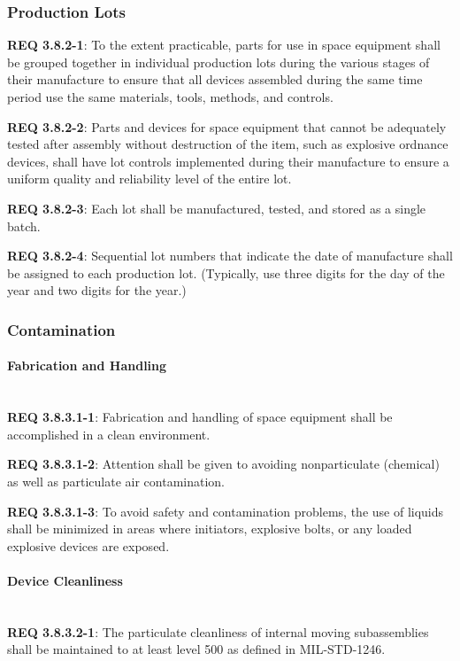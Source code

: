 \documentclass[12pt]{article}
\begin{document}
\subsubsection{Production Lots} %
\noindent \textbf{REQ 3.8.2-1}: To the extent practicable, parts for use in space equipment shall be grouped together in individual production lots during the various stages of their manufacture to ensure that all devices assembled during the same time period use the same materials, tools, methods, and controls. 

\noindent \textbf{REQ 3.8.2-2}: Parts and devices for space equipment that cannot be adequately tested after assembly without destruction of the item, such as explosive ordnance devices, shall have lot controls implemented during their manufacture to ensure a uniform quality and reliability level of the entire lot. 

\noindent \textbf{REQ 3.8.2-3}: Each lot shall be manufactured, tested, and stored as a single batch. 

\noindent \textbf{REQ 3.8.2-4}: Sequential lot numbers that indicate the date of manufacture shall be assigned to each production lot.
(Typically, use three digits for the day of the year and two digits for the year.)


\subsubsection{Contamination} %
\paragraph{Fabrication and Handling} \mbox{} \\ %
\noindent \textbf{REQ 3.8.3.1-1}: Fabrication and handling of space equipment shall be accomplished in a clean environment. 

\noindent \textbf{REQ 3.8.3.1-2}: Attention shall be given to avoiding nonparticulate (chemical) as well as particulate air contamination. 

\noindent \textbf{REQ 3.8.3.1-3}: To avoid safety and contamination problems, the use of liquids shall be minimized in areas where initiators, explosive bolts, or any loaded explosive devices are exposed.


\paragraph{Device Cleanliness} \mbox{} \\ %
\noindent \textbf{REQ 3.8.3.2-1}: The particulate cleanliness of internal moving subassemblies shall be maintained to at least level 500 as defined in MIL-STD-1246. 
\end{document}
